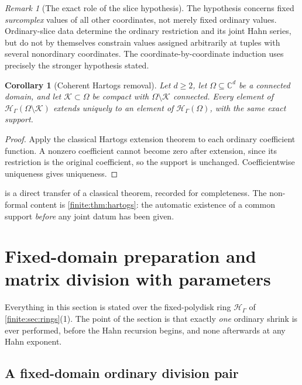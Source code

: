 \documentclass[11pt,letterpaper]{article}
\newtheorem{corollary}[theorem]{Corollary}
\theoremstyle{definition}
\theoremstyle{remark}
\newtheorem{remark}[theorem]{Remark}
\newcommand{\C}{\mathbb C}
\newcommand{\HH}{\mathscr H}
\numberwithin{equation}{section}
\begin{document}
\begin{remark}[The exact role of the slice hypothesis]
\label{finite:rem:slices}
The hypothesis concerns fixed \emph{surcomplex} values of all other coordinates, not merely fixed ordinary values. Ordinary-slice data determine the ordinary restriction and its joint Hahn series, but do not by themselves constrain values assigned arbitrarily at tuples with several nonordinary coordinates. The coordinate-by-coordinate induction uses precisely the stronger hypothesis stated.
\end{remark}

\begin{corollary}[Coherent Hartogs removal]
\label{finite:cor:hole}
Let $d\geq2$, let $\Omega\subseteq\C^d$ be a connected domain, and let $\mathcal K\subset\Omega$ be compact with $\Omega\setminus\mathcal K$ connected. Every element of $\HH_\Gamma(\Omega\setminus\mathcal K)$ extends uniquely to an element of $\HH_\Gamma(\Omega)$, with the same exact support.
\end{corollary}

\begin{proof}
Apply the classical Hartogs extension theorem \cite[Theorem 4.3.1]{finite:Lebl} to each ordinary coefficient function. A nonzero coefficient cannot become zero after extension, since its restriction is the original coefficient, so the support is unchanged. Coefficientwise uniqueness gives uniqueness.
\end{proof}

 is a direct transfer of a classical theorem, recorded for completeness. The non-formal content is \cref{finite:thm:hartogs}: the automatic existence of a common support \emph{before} any joint datum has been given.

\section{Fixed-domain preparation and matrix division with parameters}
\label{finite:sec:preparation}

Everything in this section is stated over the fixed-polydisk ring $\HH_\Gamma$ of \cref{finite:sec:rings}(1). The point of the section is that exactly \emph{one} ordinary shrink is ever performed, before the Hahn recursion begins, and none afterwards at any Hahn exponent.

\subsection{A fixed-domain ordinary division pair}
\label{finite:sec:ordinarypair}
\end{document}
